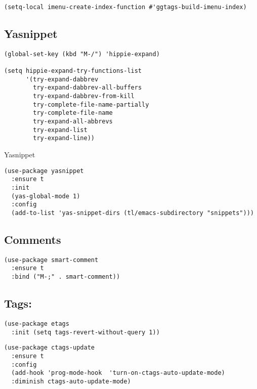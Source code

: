 \documentclass[12pt]{article}
\begin{document}
\lstset{language=Lisp,label= ,caption= ,numbers=none}
\begin{lstlisting}
(setq-local imenu-create-index-function #'ggtags-build-imenu-index)
\end{lstlisting}
\subsection{Yasnippet}
\label{sec-7-3}


\lstset{language=Lisp,label= ,caption= ,numbers=none}
\begin{lstlisting}
(global-set-key (kbd "M-/") 'hippie-expand)

(setq hippie-expand-try-functions-list
      '(try-expand-dabbrev
        try-expand-dabbrev-all-buffers
        try-expand-dabbrev-from-kill
        try-complete-file-name-partially
        try-complete-file-name
        try-expand-all-abbrevs
        try-expand-list
        try-expand-line))
\end{lstlisting}

Yasnippet

\lstset{language=Lisp,label= ,caption= ,numbers=none}
\begin{lstlisting}
(use-package yasnippet
  :ensure t
  :init
  (yas-global-mode 1)
  :config
  (add-to-list 'yas-snippet-dirs (tl/emacs-subdirectory "snippets")))
\end{lstlisting}

\subsection{Comments}
\label{sec-7-4}
\lstset{language=Lisp,label= ,caption= ,numbers=none}
\begin{lstlisting}
(use-package smart-comment
  :ensure t
  :bind ("M-;" . smart-comment))
\end{lstlisting}

\subsection{Tags:}
\label{sec-7-5}

\lstset{language=example,label= ,caption= ,numbers=none}
\begin{lstlisting}
(use-package etags
  :init (setq tags-revert-without-query 1))
\end{lstlisting}

\lstset{language=example,label= ,caption= ,numbers=none}
\begin{lstlisting}
(use-package ctags-update
  :ensure t
  :config
  (add-hook 'prog-mode-hook  'turn-on-ctags-auto-update-mode)
  :diminish ctags-auto-update-mode)
\end{lstlisting}
\end{document}
